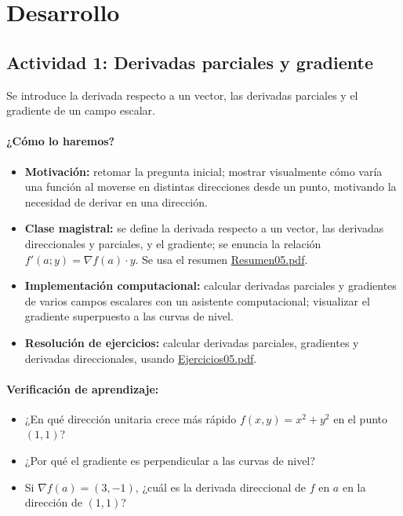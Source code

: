 \documentclass[a4,11pt]{aleph-notas}
\begin{document}
\section*{Desarrollo}

\subsection*{Actividad 1: Derivadas parciales y gradiente}
Se introduce la derivada respecto a un vector, las derivadas parciales y el gradiente de un campo escalar.

\paragraph{¿Cómo lo haremos?}
\begin{itemize}[leftmargin=*]
    \item \textbf{Motivación:} retomar la pregunta inicial; mostrar visualmente cómo varía una función al moverse en distintas direcciones desde un punto, motivando la necesidad de derivar en una dirección.
    \item \textbf{Clase magistral:} se define la derivada respecto a un vector, las derivadas direccionales y parciales, y el gradiente; se enuncia la relación $f'(a;y) = \nabla f(a)\cdot y$. Se usa el resumen \href{https://andres-merino.github.io/MatematicaIII-05-N0051/01Resumen/Resumen05.pdf}{Resumen05.pdf}.
    \item \textbf{Implementación computacional:} calcular derivadas parciales y gradientes de varios campos escalares con un asistente computacional; visualizar el gradiente superpuesto a las curvas de nivel.
    \item \textbf{Resolución de ejercicios:} calcular derivadas parciales, gradientes y derivadas direccionales, usando \href{https://andres-merino.github.io/MatematicaIII-05-N0051/04Ejercicios/Ejercicios05.pdf}{Ejercicios05.pdf}.
\end{itemize}

\paragraph{Verificación de aprendizaje:}
\begin{itemize}[leftmargin=*]
    \item ¿En qué dirección unitaria crece más rápido $f(x,y)=x^2+y^2$ en el punto $(1,1)$?
    \item ¿Por qué el gradiente es perpendicular a las curvas de nivel?
    \item Si $\nabla f(a) = (3, -1)$, ¿cuál es la derivada direccional de $f$ en $a$ en la dirección de $(1,1)$?
\end{itemize}
\end{document}
